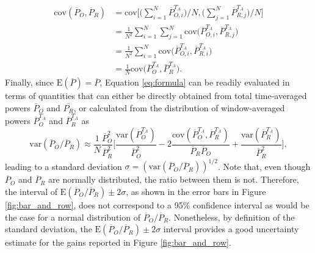\begin{align}
	\text{cov}(\overline{P}_O, \overline{P}_R) &= \text{cov} \Bigg[\bigg(\sum_{i=1}^{N}\overline{P}_{O,i}^{T_A}\bigg)/N, \bigg(\sum_{j=1}^{N}\overline{P}_{R,j}^{T_A}\bigg)/N \Bigg] \\
	&= \frac{1}{N^2} \sum_{i=1}^{N} \sum_{j=1}^{N} \text{cov}\bigg(\overline{P}_{O,i}^{T_A}, \overline{P}_{R,j}^{T_A} \bigg)\\
	&= \frac{1}{N^2} \sum_{i=1}^{N} \text{cov}\bigg(\overline{P}_{O,i}^{T_A}, \overline{P}_{R,i}^{T_A} \bigg)\\
	&= \frac{1}{N} \text{cov} \bigg( \overline{P}_O^{T_A}, \overline{P}_{R}^{T_A} \bigg).
\end{align}
\noindent Finally, since $\text{E}(\overline{P}) = \overline{P}$, Equation \eqref{eq:formula} can be readily evaluated in terms of quantities that can either be directly obtained from total time-averaged powers $\overline{P}_O$ and $\overline{P_R}$, or calculated from the distribution of window-averaged powers $\overline{P}^{T_A}_O$ and $\overline{P}^{T_A}_{R}$ as
\begin{equation}\label{eq:formula2}
\text{var} (\overline{P}_O / \overline{P}_R) \approx \frac{1}{N} \frac{\overline{P}_O^2}{\overline{P}_R^2} \bigg[ \frac{\text{var}(\overline{P}_O^{T_A})}{\overline{P}_O^2} - 2\frac{\text{cov}(\overline{P}_O^{T_A}, \overline{P}_R^{T_A})}{\overline{P}_R \overline{P}_O} + \frac{\text{var} (\overline{P}_R^{T_A})}{\overline{P}_R^2}  \bigg],
\end{equation}
leading to a standard deviation $\sigma = (\text{var} (\overline{P}_O / \overline{P}_R))^{1/2}$. Note that, even though $\overline{P}_O$ and $\overline{P}_R$ are normally distributed, the ratio between them is not. Therefore, the interval of $\text{E}(\overline{P}_O / \overline{P}_R) \pm 2 \sigma$, as shown in the error bars in Figure \ref{fig:bar_and_row}, does not correspond to a 95\% confidence interval as would be the case for a normal distribution of $\overline{P}_O / \overline{P}_R$. Nonetheless, by definition of the standard deviation, the $\text{E}(\overline{P}_O / \overline{P}_R) \pm 2 \sigma$ interval provides a good uncertainty estimate for the gains reported in Figure \ref{fig:bar_and_row}.

\cleardoublepage